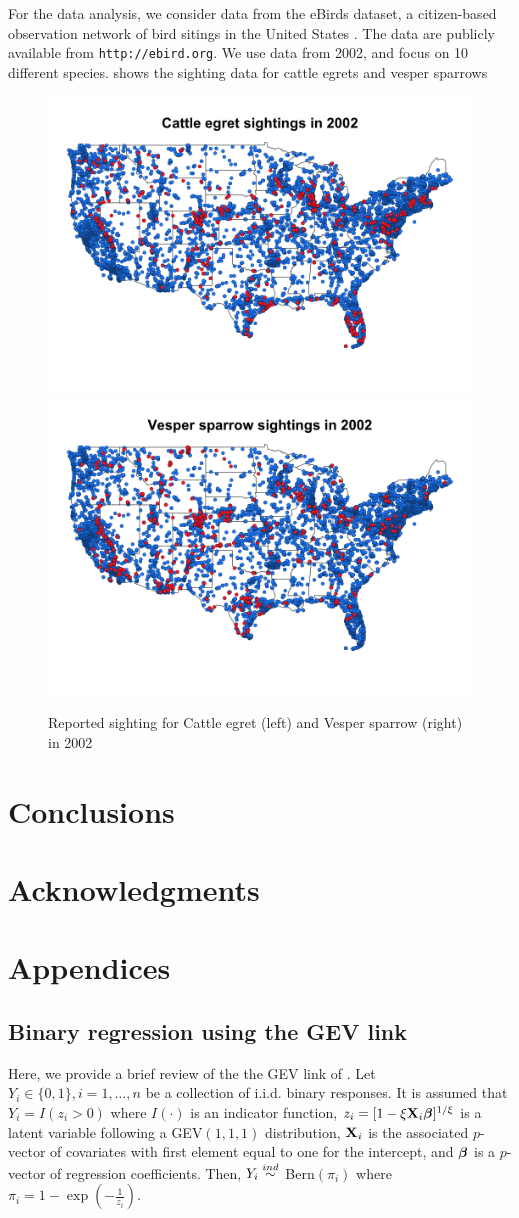 \documentclass[11pt]{article}
\begin{document}
For the data analysis, we consider data from the eBirds dataset, a citizen-based observation network of bird sitings in the United States \citep{Sullivan2009}.
The data are publicly available from {\tt http://ebird.org}.
We use data from 2002, and focus on 10 different species.
 shows the sighting data for cattle egrets and vesper sparrows

\begin{figure}
  \centering
  \includegraphics[width=0.47\linewidth]{plots/cattle_egret.png}
  \includegraphics[width=0.47\linewidth]{plots/vesper_sparrow.png}
  \caption{Reported sighting for Cattle egret (left) and Vesper sparrow (right) in 2002}
  \label{rbfig:data2002}
\end{figure}

\section{Conclusions}\label{rbs:con}

\section*{Acknowledgments}

\appendix
\section{Appendices}
\subsection{Binary regression using the GEV link}\label{rba:rarebinary}
Here, we provide a brief review of the the GEV link of \citet{Wang2010}.
Let $Y_i \in \{0, 1\}, i = 1, \ldots, n$ be a collection of i.i.d. binary responses.
It is assumed that $Y_i = I(z_i > 0)$ where $I(\cdot)$ is an indicator function, $z_i = [1 - \xi \mbox{\bf X}_i \mbox{\boldmath $\beta$}]^{1 / \xi}$ is a latent variable following a GEV$(1, 1, 1)$ distribution, $\mbox{\bf X}_i$ is the associated $p$-vector of covariates with first element equal to one for the intercept, and $\mbox{\boldmath $\beta$}$ is a $p$-vector of regression coefficients.
Then, $Y_i \stackrel{ind}{\sim}$ Bern$(\pi_i)$ where $\pi_i= 1 - \exp \left( -\frac{ 1 }{ z_i } \right)$.
\end{document}

